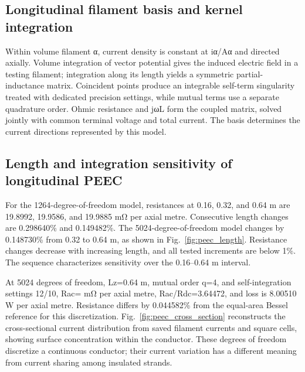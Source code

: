 \hypertarget{06.peec_derivation.heading}{}
\subsection{Longitudinal filament basis and kernel integration}

\hypertarget{06.peec_derivation.p1}{}
Within volume filament α, current density is constant at iα/Aα and directed axially. Volume integration of vector potential gives the induced electric field in a testing filament; integration along its length yields a symmetric partial-inductance matrix. Coincident points produce an integrable self-term singularity treated with dedicated precision settings, while mutual terms use a separate quadrature order. Ohmic resistance and jωL form the coupled matrix, solved jointly with common terminal voltage and total current. The basis determines the current directions represented by this model.

\hypertarget{06.peec_results.heading}{}
\subsection{Length and integration sensitivity of longitudinal PEEC}

\hypertarget{06.peec_results.p1}{}
For the 1264-degree-of-freedom model, resistances at 0.16, 0.32, and 0.64 m are 19.8992, 19.9586, and 19.9885 mΩ per axial metre. Consecutive length changes are 0.298640\% and 0.149482\%. The 5024-degree-of-freedom model changes by 0.148730\% from 0.32 to 0.64 m, as shown in Fig.~\ref{fig:peec_length}. Resistance changes decrease with increasing length, and all tested increments are below 1\%. The sequence characterizes sensitivity over the 0.16–0.64 m interval.

\hypertarget{06.peec_results.p2}{}
At 5024 degrees of freedom, Lz=0.64 m, mutual order q=4, and self-integration settings 12/10, Rac= mΩ per axial metre, Rac/Rdc=3.64472, and loss is 8.00510 W per axial metre. Resistance differs by 0.044582\% from the equal-area Bessel reference for this discretization. Fig.~\ref{fig:peec_cross_section} reconstructs the cross-sectional current distribution from saved filament currents and square cells, showing surface concentration within the conductor. These degrees of freedom discretize a continuous conductor; their current variation has a different meaning from current sharing among insulated strands.

